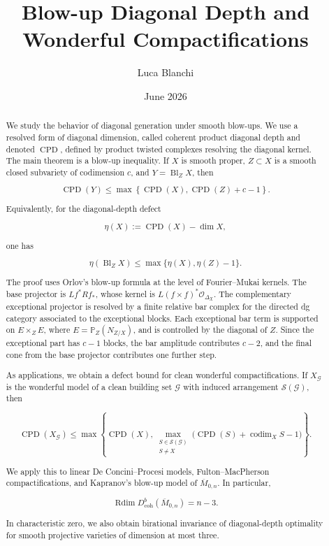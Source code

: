 \documentclass[11pt]{amsart}
\theoremstyle{definition}
\begin{document}
\title[Blow-up diagonal depth]{Blow-up Diagonal Depth and Wonderful Compactifications}
\author{Luca Blanchi}
\date{June 2026}
\begin{abstract}
We study the behavior of diagonal generation under smooth blow-ups. We use a resolved form of diagonal dimension, called coherent product diagonal depth and denoted $\operatorname{CPD}$, defined by product twisted complexes resolving the diagonal kernel. The main theorem is a blow-up inequality. If $X$ is smooth proper, $Z\subset X$ is a smooth closed subvariety of codimension $c$, and $Y=\operatorname{Bl}_ZX$, then

\[
\operatorname{CPD}(Y)
\le
\max\left\{
\operatorname{CPD}(X),
\operatorname{CPD}(Z)+c-1
\right\}.
\]

Equivalently, for the diagonal-depth defect

\[
\eta(X):=\operatorname{CPD}(X)-\dim X,
\]

one has

\[
\eta(\operatorname{Bl}_ZX)\le \max\{\eta(X),\eta(Z)-1\}.
\]

The proof uses Orlov's blow-up formula at the level of Fourier--Mukai kernels. The base projector is $Lf^*Rf_*$, whose kernel is $L(f\times f)^*\mathcal O_{\Delta_X}$. The complementary exceptional projector is resolved by a finite relative bar complex for the directed dg category associated to the exceptional blocks. Each exceptional bar term is supported on $E\times_ZE$, where $E=\mathbb P_Z(N_{Z/X})$, and is controlled by the diagonal of $Z$. Since the exceptional part has $c-1$ blocks, the bar amplitude contributes $c-2$, and the final cone from the base projector contributes one further step.

As applications, we obtain a defect bound for clean wonderful compactifications. If $X_{\mathcal G}$ is the wonderful model of a clean building set $\mathcal G$ with induced arrangement $\mathcal S(\mathcal G)$, then

\[
\operatorname{CPD}(X_{\mathcal G})
\le
\max\left\{
\operatorname{CPD}(X),
\max_{\substack{S\in \mathcal S(\mathcal G)\\ S\ne X}}
\bigl(\operatorname{CPD}(S)+\operatorname{codim}_XS-1\bigr)
\right\}.
\]

We apply this to linear De Concini--Procesi models, Fulton--MacPherson compactifications, and Kapranov's blow-up model of $\overline M_{0,n}$. In particular,

\[
\operatorname{Rdim}D^b_{\mathrm{coh}}(\overline M_{0,n})=n-3.
\]

In characteristic zero, we also obtain birational invariance of diagonal-depth optimality for smooth projective varieties of dimension at most three.
\end{abstract}
\maketitle
\end{document}
